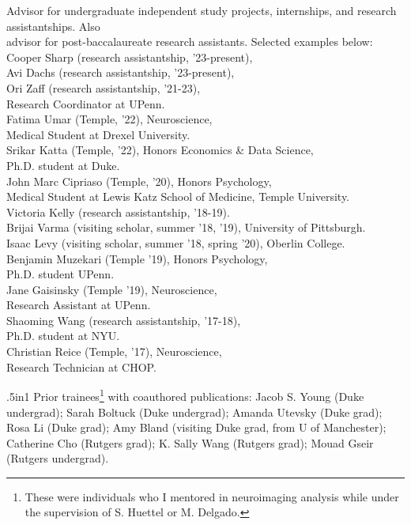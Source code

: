 \documentclass[11pt, letterpaper]{article}
\begin{document}
\begin{tabbing}
Advisor for undergraduate independent study projects, internships, and research assistantships. Also \\
\> advisor for post-baccalaureate research assistants. Selected examples below: \\  [.1cm]

\> Cooper Sharp (research assistantship, '23-present), \\
\> Avi Dachs (research assistantship, '23-present), \\
\> Ori Zaff (research assistantship, '21-23), \\
\> \> Research Coordinator at UPenn. \\
\> Fatima Umar (Temple, '22), Neuroscience, \\
\> \> Medical Student at Drexel University. \\
\> Srikar Katta (Temple, '22), Honors Economics \& Data Science, \\
\> \> Ph.D. student at Duke. \\
\> John Marc Cipriaso (Temple, '20), Honors Psychology, \\
\> \> Medical Student at Lewis Katz School of Medicine, Temple University. \\
\> Victoria Kelly (research assistantship, '18-19). \\
\> Brijai Varma (visiting scholar, summer '18, '19), University of Pittsburgh. \\
\> Isaac Levy (visiting scholar, summer '18, spring '20), Oberlin College. \\
\> Benjamin Muzekari (Temple '19), Honors Psychology, \\
\> \> Ph.D. student UPenn. \\
\> Jane Gaisinsky (Temple '19), Neuroscience, \\
\> \> Research Assistant at UPenn. \\
\> Shaoming Wang (research assistantship, '17-18), \\
\> \> Ph.D. student at NYU. \\
\> Christian Reice (Temple, '17), Neuroscience, \\
\> \> Research Technician at CHOP.

\end{tabbing}

\begin{hangparas}{.5in}{1}
Prior trainees\footnote{These were individuals who I mentored in neuroimaging analysis while under the supervision of S. Huettel or M. Delgado.} with coauthored publications: Jacob S. Young (Duke undergrad); Sarah Boltuck (Duke undergrad); Amanda Utevsky (Duke grad); Rosa Li (Duke grad); Amy Bland (visiting Duke grad, from U of Manchester); Catherine Cho (Rutgers grad); K. Sally Wang (Rutgers grad); Mouad Gseir (Rutgers undergrad).
\end{hangparas}
\end{document}
